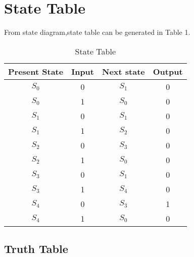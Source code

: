 \documentclass{article}
\begin{document}
\section{State Table}
  From state diagram,state table can be generated in Table 1.
  
  \vspace{5mm}
  \begin{table}[h]
  \centering
  \begin{tabular}{|c|c|c|c|}
  \hline
   
   \textbf{Present State}&{Input}&{Next state}&{Output}\\
   \hline
   
	 \textbf{$S_0$}&{0}&{$S_1$}&{0}\\
         \textbf{$S_0$}&{1}&{$S_0$}&{0}\\
         \textbf{$S_1$}&{0}&{$S_1$}&{0}\\
         \textbf{$S_1$}&{1}&{$S_2$}&{0}\\
         \textbf{$S_2$}&{0}&{$S_3$}&{0}\\
         \textbf{$S_2$}&{1}&{$S_0$}&{0}\\
         \textbf{$S_3$}&{0}&{$S_1$}&{0}\\
         \textbf{$S_3$}&{1}&{$S_4$}&{0}\\
         \textbf{$S_4$}&{0}&{$S_3$}&{1}\\
         \textbf{$S_4$}&{1}&{$S_0$}&{0}\\
  \hline
  \end{tabular}
  \vspace{5mm}
  \caption{State Table}  
  \end{table}

\subsection{Truth Table}
  
\end{document}
